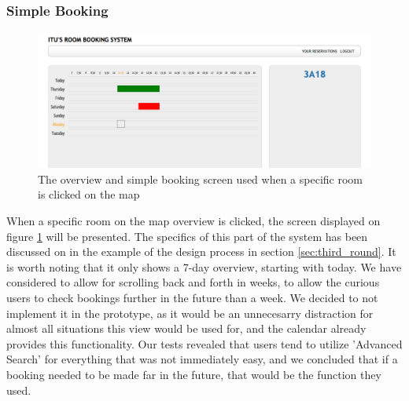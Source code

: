 \subsubsection*{Simple Booking}
\begin{figure}[htb]
\begin{center}
\leavevmode
\includegraphics[width=1\textwidth]{images/simple_booking}
\end{center}
\caption{The overview and simple booking screen used when a specific room is clicked on the map}
\label{fig:simple_booking}
\end{figure}
When a specific room on the map overview is clicked, the screen displayed on figure \ref{fig:simple_booking} will be presented. The specifics of this part of the system has been discussed on in the example of the design process in section \ref{sec:third_round}.
It is worth noting that it only shows a 7-day overview, starting with today. We have considered to allow for scrolling back and forth in weeks, to allow the curious users to check bookings further in the future than a week.
We decided to not implement it in the prototype, as it would be an unnecesarry distraction for almost all situations this view would be used for, and the calendar already provides this functionality.
Our tests revealed that users tend to utilize 'Advanced Search' for everything that was not immediately easy, and we concluded that if a booking needed to be made far in the future, that would be the function they used.

\pagebreak
